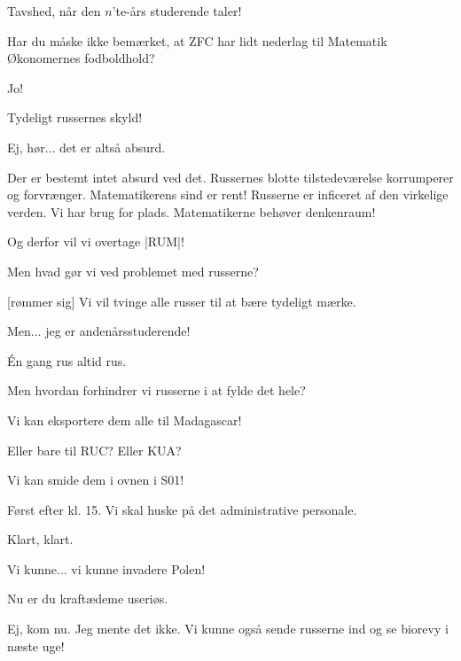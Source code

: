 \documentclass[a4paper,11pt]{article}
\begin{document}
\begin{sketch}
 Tavshed, når den $n$'te-års studerende taler!

 Har du måske ikke bemærket, at ZFC har lidt nederlag til Matematik Økonomernes fodboldhold?

 Jo!

 Tydeligt russernes skyld!

 Ej, hør... det er altså absurd.

 Der er bestemt intet absurd ved det. Russernes blotte tilstedeværelse korrumperer og forvrænger. Matematikerens sind er rent! Russerne er inficeret af den virkelige verden. Vi har brug for plads. Matematikerne behøver denkenraum!

 Og derfor vil vi overtage |RUM|!

 Men hvad gør vi ved problemet med russerne?


[rømmer sig] Vi vil tvinge alle russer til at bære tydeligt mærke.


 Men... jeg er andenårsstuderende!

 Én gang rus altid rus.


 Men hvordan forhindrer vi russerne i at fylde det hele?

 Vi kan eksportere dem alle til Madagascar!

 Eller bare til RUC? Eller KUA?

 Vi kan smide dem i ovnen i S01!

 Først efter kl. 15. Vi skal huske på det administrative personale.

 Klart, klart.

 Vi kunne... vi kunne invadere Polen!


 Nu er du kraftædeme useriøs.


 Ej, kom nu. Jeg mente det ikke. Vi kunne også sende russerne ind og se biorevy i næste uge!

\end{sketch}
\end{document}

